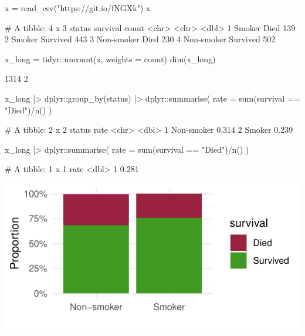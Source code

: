 \documentclass[a4paper]{article}\usepackage[]{graphicx}\usepackage[]{xcolor}
\makeatletter
\def\maxwidth{ %
  \ifdim\Gin@nat@width>\linewidth
    \linewidth
  \else
    \Gin@nat@width
  \fi
}
\makeatother
\begin{document}
\begin{Schunk}
\begin{Sinput}
x = read_csv("https://git.io/fNGXk")
x
\end{Sinput}
\begin{Soutput}
# A tibble: 4 x 3
  status     survival count
  <chr>      <chr>    <dbl>
1 Smoker     Died       139
2 Smoker     Survived   443
3 Non-smoker Died       230
4 Non-smoker Survived   502
\end{Soutput}
\begin{Sinput}
x_long = tidyr::uncount(x, weights = count)
dim(x_long)
\end{Sinput}
\begin{Soutput}
[1] 1314    2
\end{Soutput}
\begin{Sinput}
x_long |> 
  dplyr::group_by(status) |>
  dplyr::summarise(
		 rate = sum(survival == "Died")/n()
	)
\end{Sinput}
\begin{Soutput}
# A tibble: 2 x 2
  status      rate
  <chr>      <dbl>
1 Non-smoker 0.314
2 Smoker     0.239
\end{Soutput}
\begin{Sinput}
x_long |>
  dplyr::summarise(
  		 rate = sum(survival == "Died")/n()
  )
\end{Sinput}
\begin{Soutput}
# A tibble: 1 x 1
   rate
  <dbl>
1 0.281
\end{Soutput}


{\centering \includegraphics[width=\maxwidth]{figure/listings-unnamed-chunk-12-1} 

}

\end{Schunk}
\end{document}
